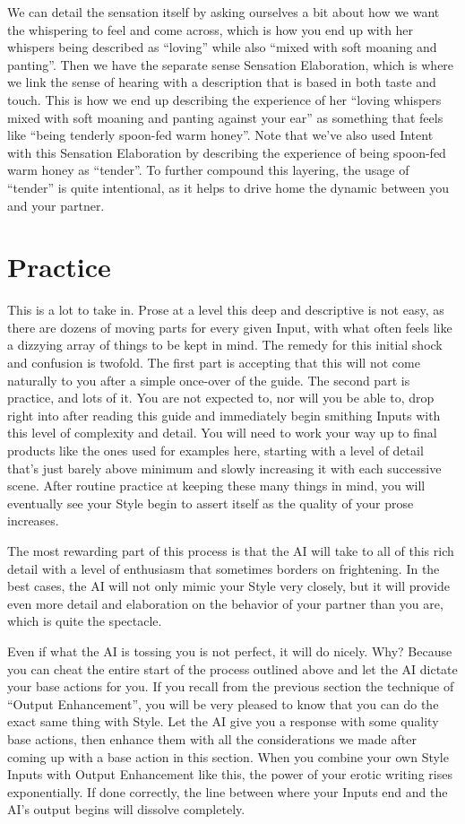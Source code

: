 \documentclass[Coomer-main.tex]{subfiles}
\begin{document}
We can detail the sensation itself by asking ourselves a bit about how we want the whispering to feel and come across, which is how you end up with her whispers being described as “loving” while also “mixed with soft moaning and panting”.
Then we have the separate sense Sensation Elaboration, which is where we link the sense of hearing with a description that is based in both taste and touch.
This is how we end up describing the experience of her “loving whispers mixed with soft moaning and panting against your ear” as something that feels like “being tenderly spoon-fed warm honey”.
Note that we’ve also used Intent with this Sensation Elaboration by describing the experience of being spoon-fed warm honey as “tender”.
To further compound this layering, the usage of “tender” is quite intentional, as it helps to drive home the dynamic between you and your partner.

\section{Practice}

This is a lot to take in.
Prose at a level this deep and descriptive is not easy, as there are dozens of moving parts for every given Input, with what often feels like a dizzying array of things to be kept in mind.
The remedy for this initial shock and confusion is twofold.
The first part is accepting that this will not come naturally to you after a simple once-over of the guide.
The second part is practice, and lots of it.
You are not expected to, nor will you be able to, drop right into \aid after reading this guide and immediately begin smithing Inputs with this level of complexity and detail.
You will need to work your way up to final products like the ones used for examples here, starting with a level of detail that’s just barely above minimum and slowly increasing it with each successive scene.
After routine practice at keeping these many things in mind, you will eventually see your Style begin to assert itself as the quality of your prose increases.

The most rewarding part of this process is that the AI will take to all of this rich detail with a level of enthusiasm that sometimes borders on frightening.
In the best cases, the AI will not only mimic your Style very closely, but it will provide even more detail and elaboration on the behavior of your partner than you are, which is quite the spectacle.

Even if what the AI is tossing you is not perfect, it will do nicely.
Why?
Because you can cheat the entire start of the process outlined above and let the AI dictate your base actions for you.
If you recall from the previous section the technique of “Output Enhancement”, you will be very pleased to know that you can do the exact same thing with Style.
Let the AI give you a response with some quality base actions, then enhance them with all the considerations we made after coming up with a base action in this section.
When you combine your own Style Inputs with Output Enhancement like this, the power of your erotic writing rises exponentially.
If done correctly, the line between where your Inputs end and the AI’s output begins will dissolve completely.
\end{document}
